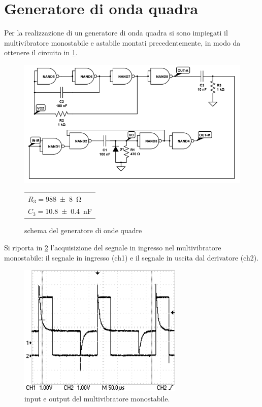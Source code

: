 
\section{Generatore di onda quadra}
	Per la realizzazione di un generatore di onda quadra si sono impiegati il multivibratore monostabile e astabile montati precedentemente, in modo da ottenere il circuito in \figurename{ \ref{f:qadra}}.

	\begin{figure}[H]
		\begin{minipage}{0.75\textwidth}
		\centering
		\includegraphics[scale=0.6]{../Figs-Tabs/qadra.png}
		\caption{schema del generatore di onde quadre}
		\label{f:qadra}
		\end{minipage}
		\begin{minipage}{0.14\textwidth}
			\begin{tabular}{l}
		$R_{3}=$\SI{988 \pm 8}{\ohm}\\
		$C_{3}=$\SI{10.8 \pm 0.4 }{\nano \farad}
			\end{tabular}
		\end{minipage}
	\end{figure}

	Si riporta in \figurename{ \ref{f:osci-qad}} l'acquisizione del segnale in
	ingresso nel multivibratore monostabile: il segnale in ingresso (ch1) e il segnale in uscita dal derivatore (ch2).

	\begin{figure}[H]
		\centering
		\includegraphics[scale=1.0]{../Figs-Tabs/deth_generator.png}
		\caption{input e output del multivibratore monostabile.}
		\label{f:osci-qad}
	\end{figure}

